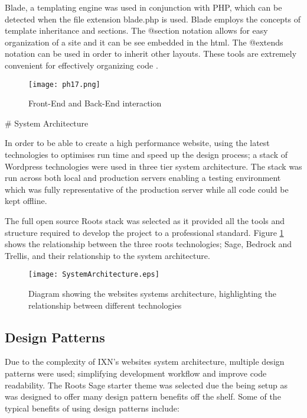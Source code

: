 Blade, a templating engine was used in conjunction with PHP, which can
be detected when the file extension blade.php is used. Blade employs the
concepts of template inheritance and sections. The @section notation
allows for easy organization of a site and it can be see embedded in the
html. The @extends notation can be used in order to inherit other
layouts. These tools are extremely convenient for effectively organizing
code \cite{p18} .

\begin{figure}[H]
      \centering
      \texttt{[image: ph17.png]}
      \caption{Front-End and Back-End interaction}
 \end{figure}

\newpage \# System Architecture

In order to be able to create a high performance website, using the
latest technologies to optimises run time and speed up the design
process; a stack of Wordpress technologies were used in three tier
system architecture. The stack was run across both local and production
servers enabling a testing environment which was fully representative of
the production server while all code could be kept offline.

The full open source Roots stack \cite{rootsweb} was selected as it
provided all the tools and structure required to develop the project to
a professional standard. Figure \ref{systemarchitecture} shows the
relationship between the three roots technologies; Sage, Bedrock and
Trellis, and their relationship to the system architecture.

\begin{figure}[H]
\centering
\texttt{[image: SystemArchitecture.eps]}
\caption{Diagram showing the websites systems architecture, highlighting the relationship between different technologies}
\label{systemarchitecture}
\end{figure}

\hypertarget{design-patterns}{%
\subsection{Design Patterns}\label{design-patterns}}

Due to the complexity of IXN's websites system architecture, multiple
design patterns were used; simplifying development workflow and improve
code readability. The Roots Sage starter theme was selected due the
being setup as was designed to offer many design pattern benefits off
the shelf. Some of the typical benefits of using design patterns
include:

